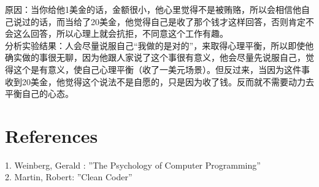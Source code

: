 原因：当你给他1美金的话，金额很小，他心里觉得不是被贿赂，所以会相信他自己说过的话，而当给了20美金，他觉得自己是收了那个钱才这样回答，否则肯定不会这么回答，所以心理上就会抗拒，不同意这个工作有趣。\\

分析实验结果：人会尽量说服自己“我做的是对的”，来取得心理平衡，所以即使他确实做的事很无聊，因为他跟人家说了这个事很有意义，他会尽量先说服自己，觉得这个是有意义，使自己心理平衡（收了一美元场景）。但反过来，当因为这件事收到20美金，他觉得这个说法不是自愿的，只是因为收了钱。反而就不需要动力去平衡自己的心态。\\





\hypertarget{ux9644ux4ef6}{%
\section{References}\label{ux9644ux4ef6}}

1. Weinberg, Gerald : ''The Psychology of Computer Programming''\\
2. Martin, Robert: ''Clean Coder''\\

